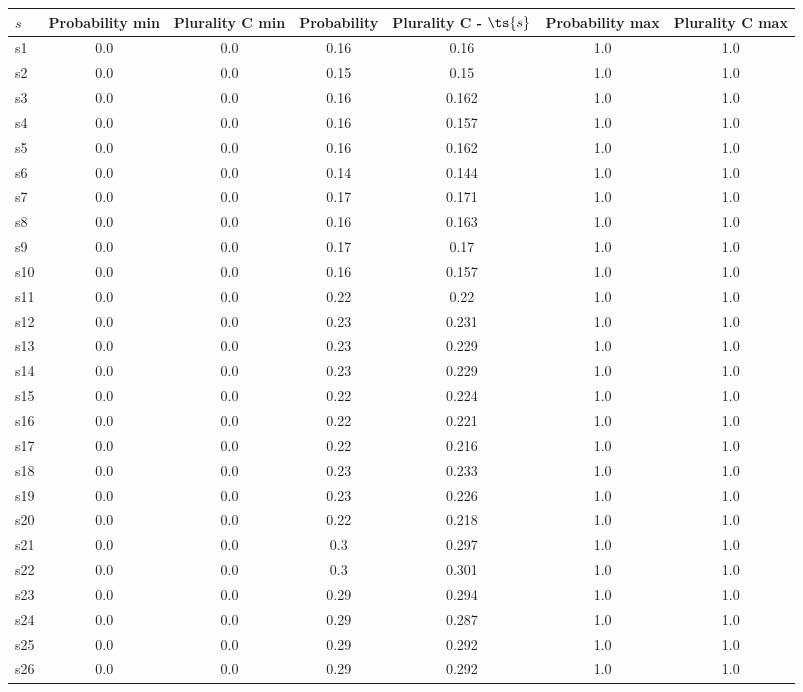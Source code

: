 \documentclass{article}
\begin{document}
\noindent\begin{tabular}{|l|c|c|c|c|c|c|}
\hline
$s$& Probability min & Plurality C min & Probability & Plurality C - $\ts{s}$ & Probability max & Plurality C max\\
\hline
s1 &0.0 & 0.0 & 0.16 & 0.16 & 1.0 & 1.0\\
\hline
s2 &0.0 & 0.0 & 0.15 & 0.15 & 1.0 & 1.0\\
\hline
s3 &0.0 & 0.0 & 0.16 & 0.162 & 1.0 & 1.0\\
\hline
s4 &0.0 & 0.0 & 0.16 & 0.157 & 1.0 & 1.0\\
\hline
s5 &0.0 & 0.0 & 0.16 & 0.162 & 1.0 & 1.0\\
\hline
s6 &0.0 & 0.0 & 0.14 & 0.144 & 1.0 & 1.0\\
\hline
s7 &0.0 & 0.0 & 0.17 & 0.171 & 1.0 & 1.0\\
\hline
s8 &0.0 & 0.0 & 0.16 & 0.163 & 1.0 & 1.0\\
\hline
s9 &0.0 & 0.0 & 0.17 & 0.17 & 1.0 & 1.0\\
\hline
s10 &0.0 & 0.0 & 0.16 & 0.157 & 1.0 & 1.0\\
\hline
s11 &0.0 & 0.0 & 0.22 & 0.22 & 1.0 & 1.0\\
\hline
s12 &0.0 & 0.0 & 0.23 & 0.231 & 1.0 & 1.0\\
\hline
s13 &0.0 & 0.0 & 0.23 & 0.229 & 1.0 & 1.0\\
\hline
s14 &0.0 & 0.0 & 0.23 & 0.229 & 1.0 & 1.0\\
\hline
s15 &0.0 & 0.0 & 0.22 & 0.224 & 1.0 & 1.0\\
\hline
s16 &0.0 & 0.0 & 0.22 & 0.221 & 1.0 & 1.0\\
\hline
s17 &0.0 & 0.0 & 0.22 & 0.216 & 1.0 & 1.0\\
\hline
s18 &0.0 & 0.0 & 0.23 & 0.233 & 1.0 & 1.0\\
\hline
s19 &0.0 & 0.0 & 0.23 & 0.226 & 1.0 & 1.0\\
\hline
s20 &0.0 & 0.0 & 0.22 & 0.218 & 1.0 & 1.0\\
\hline
s21 &0.0 & 0.0 & 0.3 & 0.297 & 1.0 & 1.0\\
\hline
s22 &0.0 & 0.0 & 0.3 & 0.301 & 1.0 & 1.0\\
\hline
s23 &0.0 & 0.0 & 0.29 & 0.294 & 1.0 & 1.0\\
\hline
s24 &0.0 & 0.0 & 0.29 & 0.287 & 1.0 & 1.0\\
\hline
s25 &0.0 & 0.0 & 0.29 & 0.292 & 1.0 & 1.0\\
\hline
s26 &0.0 & 0.0 & 0.29 & 0.292 & 1.0 & 1.0\\
\hline

\end{tabular}
\end{document}

